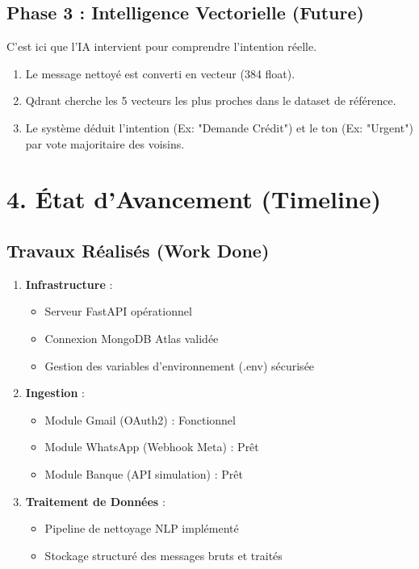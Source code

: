 \documentclass[11pt]{article}
\begin{document}
\subsection{Phase 3 : Intelligence Vectorielle (Future)}
C'est ici que l'IA intervient pour comprendre l'intention réelle.
\begin{enumerate}
    \item Le message nettoyé est converti en vecteur (384 float).
    \item Qdrant cherche les 5 vecteurs les plus proches dans le dataset de référence.
    \item Le système déduit l'intention (Ex: "Demande Crédit") et le ton (Ex: "Urgent") par vote majoritaire des voisins.
\end{enumerate}

\section{4. État d'Avancement (Timeline)}

\subsection{Travaux Réalisés (Work Done)}
\begin{enumerate}
    \item \textbf{Infrastructure} :
    \begin{itemize}
        \item Serveur FastAPI opérationnel
        \item Connexion MongoDB Atlas validée
        \item Gestion des variables d'environnement (.env) sécurisée
    \end{itemize}
    \item \textbf{Ingestion} :
    \begin{itemize}
        \item Module Gmail (OAuth2) : Fonctionnel
        \item Module WhatsApp (Webhook Meta) : Prêt
        \item Module Banque (API simulation) : Prêt
    \end{itemize}
    \item \textbf{Traitement de Données} :
    \begin{itemize}
        \item Pipeline de nettoyage NLP implémenté
        \item Stockage structuré des messages bruts et traités
    \end{itemize}
\end{enumerate}
\end{document}
